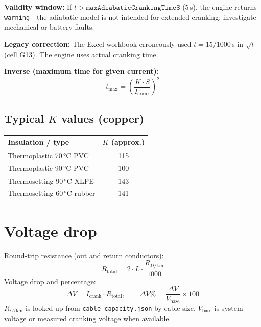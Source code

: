 \documentclass[11pt,a4paper]{report}
\begin{document}
\textbf{Validity window:} If $t > \texttt{maxAdiabaticCrankingTimeS}$ (5\,s), the engine returns \texttt{warning}---the adiabatic model is not intended for extended cranking; investigate mechanical or battery faults.

\textbf{Legacy correction:} The Excel workbook erroneously used $t = 15/1000$\,s in $\sqrt{t}$ (cell G13). The engine uses actual cranking time.

\textbf{Inverse (maximum time for given current):}
\begin{equation}
  t_\mathrm{max} = \left(\frac{K \cdot S}{I_\mathrm{crank}}\right)^2
\end{equation}

\subsection{Typical $K$ values (copper)}

\begin{table}[h]
  \centering
  \begin{tabular}{@{}lc@{}}
    \toprule
    Insulation / type & $K$ (approx.) \\
    \midrule
    Thermoplastic 70\,°C PVC & 115 \\
    Thermoplastic 90\,°C PVC & 100 \\
    Thermosetting 90\,°C XLPE & 143 \\
    Thermosetting 60\,°C rubber & 141 \\
    \bottomrule
  \end{tabular}
\end{table}

\section{Voltage drop}

Round-trip resistance (out and return conductors):
\begin{equation}
  R_\mathrm{total} = 2 \cdot L \cdot \frac{R_{\Omega/\mathrm{km}}}{1000}
\end{equation}
Voltage drop and percentage:
\begin{equation}
  \Delta V = I_\mathrm{crank} \cdot R_\mathrm{total}, \qquad
  \Delta V\% = \frac{\Delta V}{V_\mathrm{base}} \times 100
\end{equation}
$R_{\Omega/\mathrm{km}}$ is looked up from \texttt{cable-capacity.json} by cable size. $V_\mathrm{base}$ is system voltage or measured cranking voltage when available.
\end{document}
